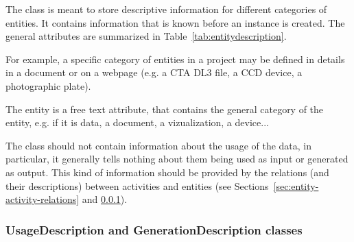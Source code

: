 The  class is meant to store descriptive information for different categories of entities. It contains information that is known before an  instance is created. The  general attributes are summarized in Table~\ref{tab:entitydescription}.

For example, a specific category of entities in a project may be defined in details in a document or on a webpage (e.g. a CTA DL3 file, a CCD device, a photographic plate).

The entity  is a free text attribute, that contains the general category of the entity, e.g. if it is data, a document, a vizualization, a device...



The  class should not contain information about the usage of the data, in particular, it generally tells nothing about them being used as input or generated as output. This kind of information should be provided by the relations (and their descriptions) between activities and entities (see Sections~\ref{sec:entity-activity-relations} and \ref{sec:use_gen_desc}).


\subsubsection{UsageDescription and GenerationDescription classes}
\label{sec:use_gen_desc}

